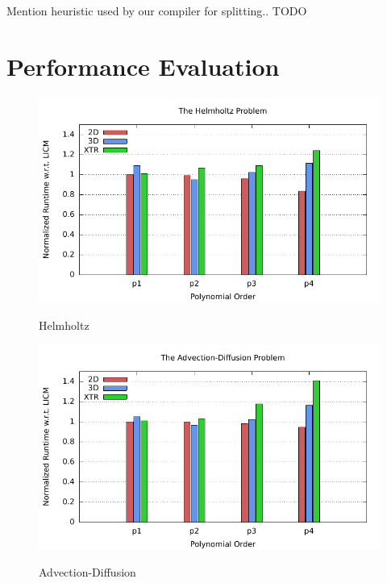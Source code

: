\documentclass[conference]{IEEEtran}
\begin{document}
Mention heuristic used by our compiler for splitting.. TODO

\clearpage

\section{Performance Evaluation}
\label{sec:perf-results}
\begin{figure}[h]
\centerline{\includegraphics[scale=0.7]{Pictures/helmholtz-normalized.pdf}
\label{fig_first_case}}
\caption{Helmholtz}
\end{figure}

\begin{figure}[h]
\centerline{\includegraphics[scale=0.7]{Pictures/advdiff-normalized.pdf}
\label{fig_first_case}}
\caption{Advection-Diffusion}
\end{figure}
\end{document}
